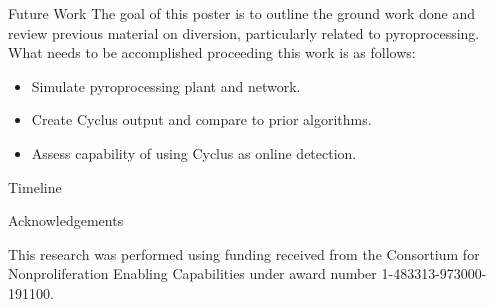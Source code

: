 \documentclass[final]{beamer}
\newlength{\sepwid}
\newlength{\onecolwid}
\newlength{\threecolwid}
\begin{document}
\begin{frame}[t]
\begin{columns}[t,totalwidth=\threecolwid]
\begin{column}{\sepwid}\end{column} %

\begin{column}{\onecolwid} %
	

\begin{alertblock}{Future Work}
	The goal of this poster is to outline the ground work done and review previous material on diversion, particularly related
	to pyroprocessing. What needs to be accomplished proceeding this work is as follows:
	\begin{itemize}
		\item Simulate pyroprocessing plant and network.
		\item Create Cyclus output and compare to prior algorithms.
		\item Assess capability of using Cyclus as online detection.
	\end{itemize} 

\end{alertblock}


\begin{block}{Timeline}
        
\end{block}





\begin{block}{Acknowledgements}
	
	This research was performed using funding received
	from the Consortium for Nonproliferation Enabling
	Capabilities under award number 1-483313-973000-191100.
	

\end{block}
\end{column}
\end{columns}
\end{frame}
\end{document}
